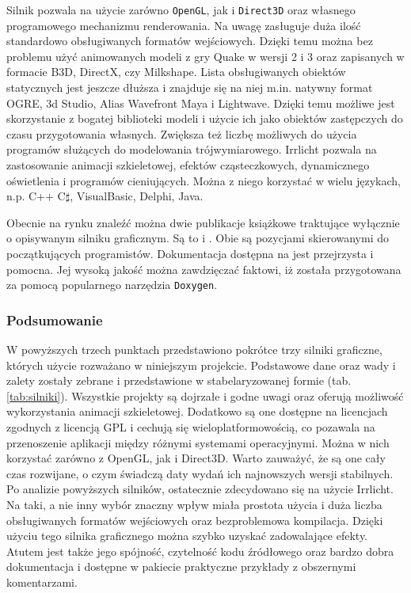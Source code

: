 \documentclass[11pt]{mwrep}
\begin{document}
      Silnik pozwala na użycie zarówno \texttt{OpenGL}, jak i \texttt{Direct3D} oraz własnego programowego mechanizmu renderowania. Na uwagę zasługuje duża ilość standardowo obsługiwanych formatów wejściowych. Dzięki temu można bez problemu użyć animowanych modeli z gry Quake w wersji 2 i 3 oraz zapisanych w formacie B3D, DirectX, czy Milkshape. Lista obsługiwanych obiektów statycznych jest jeszcze dłuższa i znajduje się na niej m.in. natywny format OGRE, 3d Studio, Alias Wavefront Maya i Lightwave. Dzięki temu możliwe jest skorzystanie z bogatej biblioteki modeli i użycie ich jako obiektów zastępczych do czasu przygotowania własnych. Zwiększa też liczbę możliwych do użycia programów służących do modelowania trójwymiarowego. Irrlicht pozwala na zastosowanie animacji szkieletowej, efektów cząsteczkowych, dynamicznego oświetlenia i programów cieniujących. Można z niego korzystać w wielu językach, n.p. C++ C$\sharp$, VisualBasic, Delphi, Java.

       Obecnie na rynku znaleźć można dwie publikacje książkowe traktujące wyłącznie o opisywanym silniku graficznym. Są to \cite{irrlichtb1} i \cite{irrlichtb2}. Obie są pozycjami skierowanymi do początkujących programistów. Dokumentacja dostępna na \cite{irrlichtw} jest przejrzysta i pomocna. Jej wysoką jakość można zawdzięczać faktowi, iż została przygotowana za pomocą popularnego narzędzia \texttt{Doxygen}.

      \subsubsection{Podsumowanie}

      W powyższych trzech punktach przedstawiono pokrótce trzy silniki graficzne, których użycie rozważano w niniejszym projekcie. Podstawowe dane oraz wady i zalety zostały zebrane i przedstawione w stabelaryzowanej formie (tab. \ref{tab:silniki}). Wszystkie projekty są dojrzałe i godne uwagi oraz oferują możliwość wykorzystania animacji szkieletowej. Dodatkowo są one dostępne na licencjach zgodnych z licencją GPL i cechują się wieloplatformowością, co pozawala na przenoszenie aplikacji między różnymi systemami operacyjnymi. Można w nich korzystać zarówno z OpenGL, jak i Direct3D. Warto zauważyć, że są one cały czas rozwijane, o czym świadczą daty wydań ich najnowszych wersji stabilnych. Po analizie powyższych silników, ostatecznie zdecydowano się na użycie Irrlicht. Na taki, a nie inny wybór znaczny wpływ miała prostota użycia i duża liczba obsługiwanych formatów wejściowych oraz bezproblemowa kompilacja. Dzięki użyciu tego silnika graficznego można szybko uzyskać zadowalające efekty. Atutem jest także jego spójność, czytelność kodu źródłowego oraz bardzo dobra dokumentacja i dostępne w pakiecie praktyczne przykłady z obszernymi komentarzami.
\end{document}
